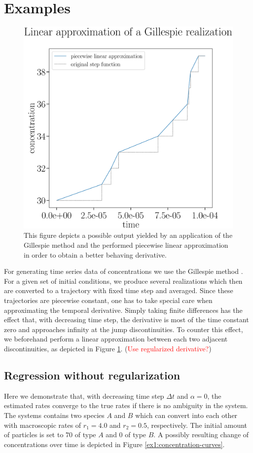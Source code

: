 \documentclass[oneside, abstracton, titlepage]{scrartcl}
\begin{document}
	\section{Examples}
	
	\begin{figure}
		\begin{center}
			\includegraphics[width=.5\textwidth]{./figures_tex/aux_linear_approximation.eps}
		\end{center}
		\caption{This figure depicts a possible output yielded by an application of the Gillespie method and the performed piecewise linear approximation in order to obtain a better behaving derivative.}
		\label{examples:linear-approximation}
	\end{figure}
	
	For generating time series data of concentrations we use the Gillespie method \cite{Gillespie1976}. For a given set of initial conditions, we produce several realizations which then are converted to a trajectory with fixed time step and averaged. Since these trajectories are piecewise constant, one has to take special care when approximating the temporal derivative. Simply taking finite differences has the effect that, with decreasing time step, the derivative is most of the time constant zero and approaches infinity at the jump discontinuities. To counter this effect, we beforehand perform a linear approximation between each two adjacent discontinuities, as depicted in Figure \ref{examples:linear-approximation}. (\textcolor{red}{Use regularized derivative?})
	
	\subsection{Regression without regularization}
	\label{sec:ex1}
	
	Here we demonstrate that, with decreasing time step $\Delta t$ and $\alpha=0$, the estimated rates converge to the true rates if there is no ambiguity in the system. The systems contains two species $A$ and $B$ which can convert into each other with macroscopic rates of $r_1=4.0$ and $r_2=0.5$, respectively. The initial amount of particles is set to $70$ of type $A$ and $0$ of type $B$. A possibly resulting change of concentrations over time is depicted in Figure \ref{ex1:concentration-curves}.
	
\end{document}
